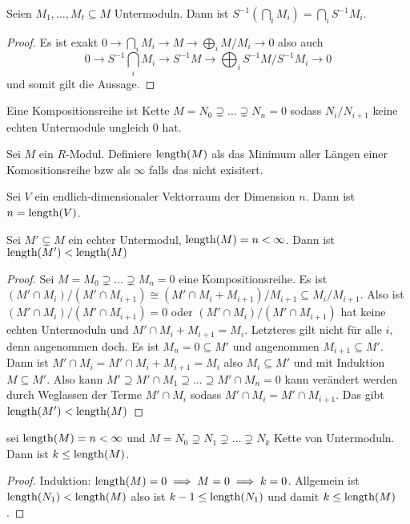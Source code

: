 \begin{Kor}
    Seien $M_1,\dots,M_t\subseteq M$ Untermoduln. Dann ist $S^{-1}(\bigcap_i M_i)=\bigcap_i S^{-1}M_i$.
\end{Kor}
\begin{proof}
    Es ist exakt $0\to \bigcap_i M_i\to M\to \bigoplus_i M/M_i\to 0$ also auch 
    $$0\to S^{-1}\bigcap_i M_i\to S^{-1}M\to \bigoplus_i S^{-1}M/S^{-1}M_i\to 0$$ und somit gilt die Aussage.
\end{proof}
\begin{Def}
    Eine Kompositionsreihe ist Kette $M=N_0\supsetneq \dots \supsetneq N_n=0$ sodass $N_i/N_{i+1}$ keine echten Untermodule ungleich $0$ hat.
\end{Def}
\begin{Def}
    Sei $M$ ein $R$-Modul. Definiere 
    $\operatorname{length}(M)$ als das Minimum aller Längen einer Komositionsreihe bzw als $\infty$ falls das nicht exisitert.
\end{Def}
\begin{Bsp}
    Sei $V$ ein endlich-dimensionaler Vektorraum der Dimension $n$. Dann ist $n=\operatorname{length}(V)$.
\end{Bsp}
\begin{Lemma}
    Sei $M'\subsetneq M$ ein echter Untermodul, $\operatorname{length}(M)=n<\infty$. Dann ist $\operatorname{length}(M')<\operatorname{length}(M)$
\end{Lemma}
\begin{proof}
    Sei $M=M_0\supsetneq \dots\supsetneq M_n=0$ eine Kompositionsreihe. Es ist $(M'\cap M_i)/(M'\cap M_{i+1})\cong (M'\cap M_i+M_{i+1})/M_{i+1}\subseteq M_i/M_{i+1}$.
    Also ist $(M'\cap M_i)/(M'\cap M_{i+1})=0$ oder $(M'\cap M_i)/(M'\cap M_{i+1})$ hat keine echten Untermoduln und $M'\cap M_i+M_{i+1}=M_i$.
    Letzteres gilt nicht für alle $i$, denn angenommen doch. Es ist $M_n=0\subseteq M'$ und angenommen $M_{i+1}\subseteq M'$. Dann ist $M'\cap M_i=M'\cap M_i+M_{i+1}=M_i$ also $M_i\subseteq M'$ und mit Induktion $M\subseteq M'$.
    Also kann $M'\supseteq M'\cap M_1\supseteq\dots \supseteq M'\cap M_n=0$ kann verändert werden durch Weglassen der Terme $M'\cap M_i$ sodass $M'\cap M_i=M'\cap M_{i+1}$. Das gibt $\operatorname{length}(M')<\operatorname{length}(M)$
\end{proof}
\begin{Lemma}
    sei $\operatorname{length}(M)=n<\infty$ und $M=N_0\supsetneq N_1\supsetneq\dots\supsetneq N_k$ Kette von Untermoduln. Dann ist $k\leq \operatorname{length}(M)$. 
\end{Lemma}
\begin{proof}
    Induktion: $\operatorname{length}(M)=0\implies M=0\implies k=0$.
    Allgemein ist $\operatorname{length}(N_1)<\operatorname{length}(M)$ also ist $k-1\leq \operatorname{length}(N_1)$ und damit $k\leq \operatorname{length}(M)$.
\end{proof}
